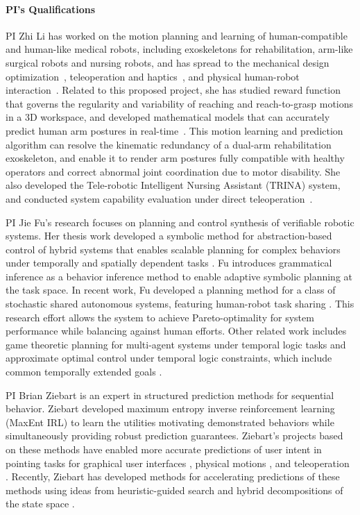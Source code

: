 \documentclass[letterpaper, 11 pt, onecolumn]{article}
\begin{document}
\paragraph*{PI's Qualifications}
PI Zhi Li has worked on the motion planning and learning of human-compatible and human-like medical robots, including exoskeletons for rehabilitation, arm-like surgical robots and nursing robots, and has spread to the mechanical design optimization~\cite{li2016design}, teleoperation and haptics~\cite{li2009networked,li2009remote}, and physical human-robot interaction~\cite{li2017study}. Related to this proposed project, she has studied reward function that governs the regularity and variability of reaching and reach-to-grasp motions in a 3D workspace, and developed mathematical models that can accurately predict human arm postures in real-time~\cite{kim2012resolving,Rosen_Li_EMBC:13,Rosen_Li_IROSChapt:13,Rosen_Li_IROS:14,Rosen_Li_J:14, li2017reaching}. This motion learning and prediction algorithm can resolve the kinematic redundancy of a dual-arm rehabilitation exoskeleton, and enable it to render arm postures fully compatible with healthy operators and correct abnormal joint coordination due to motor disability. She also developed the Tele-robotic Intelligent Nursing Assistant (TRINA) system, and conducted system capability evaluation under direct teleoperation~\cite{Hauser_Li_TRINA:17}.



PI Jie Fu's research focuses on planning and control synthesis of verifiable robotic systems. Her thesis work developed a symbolic method for abstraction-based control of hybrid systems that enables scalable planning for complex behaviors under temporally and spatially dependent tasks \cite{fu2013bottom}. Fu introduces grammatical inference \cite{fu2014adaptive} as a behavior inference method to enable adaptive symbolic planning at the task space. In recent work, Fu developed a  planning method for a class of stochastic shared autonomous systems, featuring  human-robot task sharing \cite{fu2016synthesis}. This research effort allows the system to achieve Pareto-optimality for system  performance while balancing against human efforts. Other related  work  includes game theoretic planning for multi-agent systems under  temporal logic tasks \cite{fu2015concurrent} and approximate optimal control under temporal logic constraints, which include common temporally extended goals \cite{fu2017sampling}.

PI Brian Ziebart is an expert in structured prediction methods for sequential behavior.  Ziebart developed maximum entropy inverse reinforcement learning (MaxEnt IRL) \cite{ziebart2008maximum,ziebart2010modeling} to learn the utilities motivating demonstrated behaviors while simultaneously providing robust prediction guarantees. 
Ziebart's projects based on these methods have enabled more accurate predictions of user intent in pointing tasks for graphical user interfaces \cite{ziebart2012probabilistic}, physical motions \cite{monfort2015intent}, and teleoperation \cite{schultz2017goal}.
Recently, Ziebart has developed methods for accelerating predictions of these methods using ideas from heuristic-guided search \cite{monfort2015softstar} and hybrid decompositions of the state space \cite{byravan2015graph}.
\end{document}
